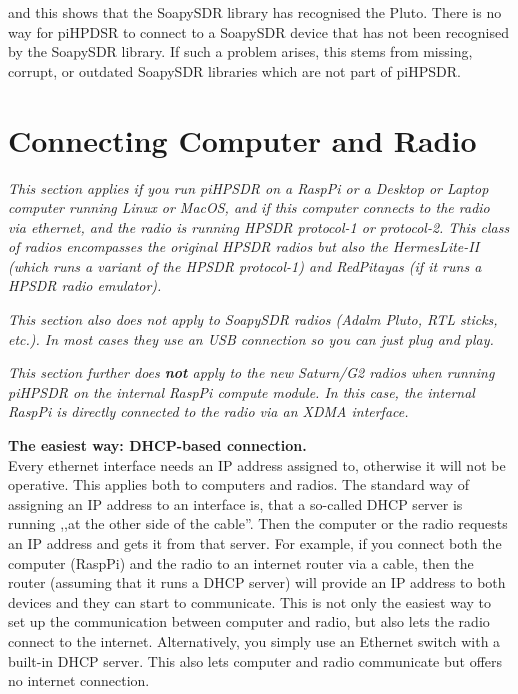 \documentclass[12pt]{book}
\def\pH{pi\-HPSDR\xspace}
\begin{document}
and this shows that the SoapySDR library has recognised the Pluto.
There is no way for piHPDSR to connect
to a SoapySDR device that has not been recognised by the SoapySDR library. If such a problem arises, this
stems from missing, corrupt, or outdated SoapySDR libraries which are not part of \pH.
\chapter[Connecting the Computer and the Radio]{Connecting Computer and Radio}
\label{sec:dhcp}
\textit{This section applies if you run \pH on a
RaspPi or a Desktop or Laptop computer running Linux or MacOS, and if this computer connects to the
radio via ethernet, and the radio is running HPSDR protocol-1 or protocol-2. This class of radios
encompasses the original HPSDR radios but also the HermesLite-II (which runs a variant of the HPSDR
protocol-1) and RedPitayas (if it runs a HPSDR radio emulator).}

\textit{This section also does not apply to SoapySDR radios (Adalm Pluto, RTL sticks, etc.). In most
cases they use an USB connection so you can just plug and play.}

\textit{This section further does \textbf{not} apply to the new Saturn/G2 radios when running \pH on the
internal RaspPi compute module. In this case, the internal RaspPi
is directly connected to the radio via an XDMA interface.}


\textbf{The easiest way: DHCP-based connection.}\\
Every ethernet interface needs an IP address assigned to, otherwise it will not be operative. This applies
both to computers and radios. The standard way of assigning an IP address to an interface is, that
a so-called DHCP server is running ,,at the other side of the cable''. Then the computer or the radio
requests an IP address and gets it from that server. For example, if you connect both the computer (RaspPi)
and the radio to an internet router via a cable, then the router (assuming that it runs a DHCP server)
will provide an IP address to both devices and they can start to communicate. This is not only the
easiest way to set up the communication between computer and radio, but also lets the radio connect
to the internet. Alternatively, you simply use an Ethernet switch with a built-in DHCP server. This also
lets computer and radio communicate but offers no internet connection.
\end{document}
